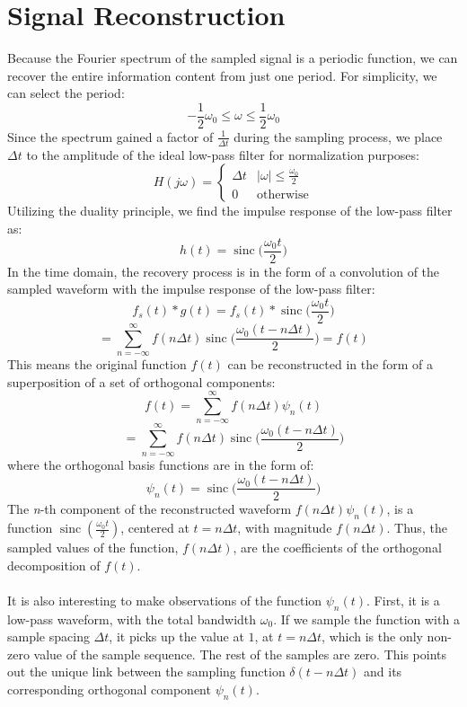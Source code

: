 \documentclass{article}
\begin{document}
\section{Signal Reconstruction}
Because the Fourier spectrum of the sampled signal is a periodic function, we can recover
the entire information content from just one period. For simplicity, we can select the
period:
\[
-\frac{1}{2}\omega_0 \leq \omega \leq \frac{1}{2}\omega_0
\]
Since the spectrum gained a factor of \(\frac{1}{\Delta t}\) during the sampling process, we place \(\Delta t\) to the amplitude of the ideal low-pass filter for normalization purposes:
\[
H(j\omega) = \begin{cases}
\Delta t & |\omega| \leq \frac{\omega_0}{2} \\
0 & \text{otherwise}
\end{cases}
\]
Utilizing the duality principle, we find the impulse response of the low-pass filter as:
\[
h(t) = \operatorname{sinc}\bigg(\frac{\omega_0 t}{2}\bigg)
\]
In the time domain, the recovery process is in the form of a convolution of the sampled
waveform with the impulse response of the low-pass filter:
\[
f_s(t)*g(t) = f_s(t)*\operatorname{sinc}\bigg(\frac{\omega_0 t}{2}\bigg)
\]
\[
= \sum_{n=-\infty}^{\infty}f(n\Delta t)\operatorname{sinc}\bigg(\frac{\omega_0 (t-n\Delta t)}{2}\bigg)
= f(t)
\]
This means the original function \(f(t)\) can be reconstructed in the form of a superposition of a set of orthogonal components:
\[
f(t) = \sum_{n=-\infty}^{\infty} f(n\Delta t) \psi_n(t)
\]
\[
= \sum_{n=-\infty}^{\infty}f(n\Delta t)\operatorname{sinc}\bigg(\frac{\omega_0 (t-n\Delta t)}{2}\bigg)
\]
where the orthogonal basis functions are in the form of:
\[
\psi_n(t)=\operatorname{sinc}\bigg(\frac{\omega_0 (t-n\Delta t)}{2}\bigg)
\]
The \textit{n}-th component of the reconstructed waveform \(f(n\Delta t)\psi_n(t)\), is a function \(\operatorname{sinc}(\frac{\omega_0 t}{2})\),
centered at \(t = n\Delta t\), with magnitude \(f(n\Delta t)\). Thus, the sampled values of the function,
\({f(n\Delta t)}\), are the coefficients of the orthogonal decomposition of \(f(t)\).
\\
\\
It is also interesting to make observations of the function \(\psi_n(t)\). First, it is a low-pass waveform, with the total bandwidth \(\omega_0\). If we sample the function with a sample spacing \(\Delta t\), it picks up the value at \(1\), at \(t = n\Delta t\), which is the only non-zero value of the sample sequence. The rest of the samples are zero. This points out the unique link between the sampling function \(\delta (t-n\Delta t)\) and its corresponding orthogonal component \(\psi_n(t)\).
\end{document}
